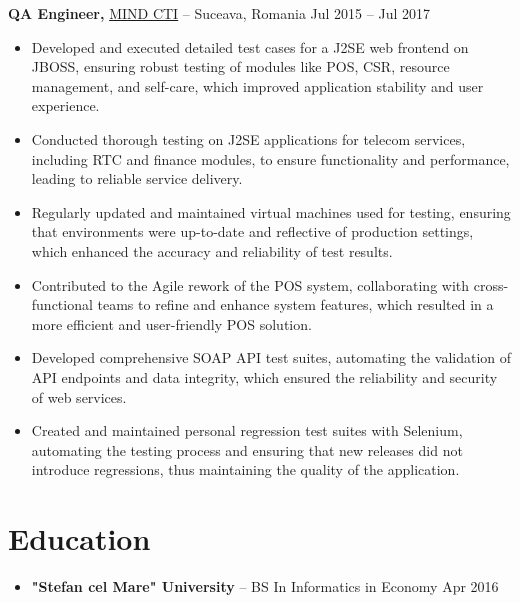 \documentclass[11pt]{article}       %
\begin{document}
\textbf{QA Engineer,} \href{https://mindcti.com/}{MIND CTI} -- Suceava, Romania \hfill Jul 2015 – Jul 2017
\vspace{-9pt}

\begin{itemize}
    \item Developed and executed detailed test cases for a J2SE web frontend on JBOSS, ensuring robust testing of modules like POS, CSR, resource management, and self-care, which improved application stability and user experience.
    \item Conducted thorough testing on J2SE applications for telecom services, including RTC and finance modules, to ensure functionality and performance, leading to reliable service delivery.
    \item Regularly updated and maintained virtual machines used for testing, ensuring that environments were up-to-date and reflective of production settings, which enhanced the accuracy and reliability of test results.
    \item Contributed to the Agile rework of the POS system, collaborating with cross-functional teams to refine and enhance system features, which resulted in a more efficient and user-friendly POS solution.
    \item Developed comprehensive SOAP API test suites, automating the validation of API endpoints and data integrity, which ensured the reliability and security of web services.
    \item Created and maintained personal regression test suites with Selenium, automating the testing process and ensuring that new releases did not introduce regressions, thus maintaining the quality of the application.
\end{itemize}
\vspace{-18.5pt}

\section*{Education}
\begin{itemize}
    \item \textbf{"Stefan cel Mare" University} -- BS In Informatics in Economy \hfill Apr 2016
\end{itemize}
\end{document}

